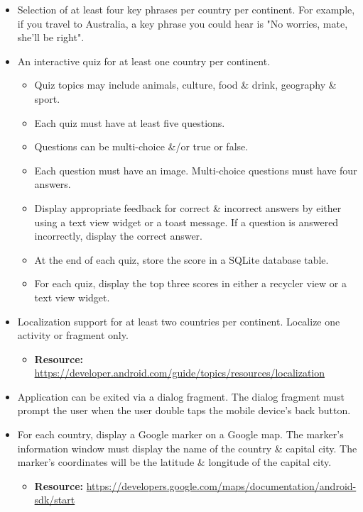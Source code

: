 \documentclass{article}
\begin{document}
\begin{itemize}
	\item Selection of at least four key phrases per country per continent. For example, if you travel to Australia, a key phrase you could hear is "No worries, mate, she'll be right".
	\item An interactive quiz for at least one country per continent.
	      \begin{itemize}
	      	\item Quiz topics may include animals, culture, food \& drink, geography \& sport.
	      	\item Each quiz must have at least five questions.
	      	\item Questions can be multi-choice \&/or true or false.
	      	\item Each question must have an image. Multi-choice questions must have four answers.
	      	\item Display appropriate feedback for correct \& incorrect answers by either using a text view widget or a toast message. If a question is answered incorrectly, display the correct answer.
	      	\item At the end of each quiz, store the score in a SQLite database table. 
	      	\item For each quiz, display the top three scores in either a recycler view or a text view widget.
	      \end{itemize}
	\item Localization support for at least two countries per continent. Localize one activity or fragment only.
	      \begin{itemize}
	      	\item \textbf{Resource:} \footnotesize\href{https://developer.android.com/guide/topics/resources/localization/}{https://developer.android.com/guide/topics/resources/localization}
	      \end{itemize}
	\item Application can be exited via a dialog fragment. The dialog fragment must prompt the user when the user double taps the mobile device's back button.
	\item For each country, display a Google marker on a Google map. The marker's information window must display the name of the country \& capital city. The marker's coordinates will be the latitude \& longitude of the capital city.
	      \begin{itemize}
	      	\item \textbf{Resource:} \footnotesize\href{https://developers.google.com/maps/documentation/android-sdk/start}{https://developers.google.com/maps/documentation/android-sdk/start}

\end{itemize}
\end{itemize}
\end{document}
